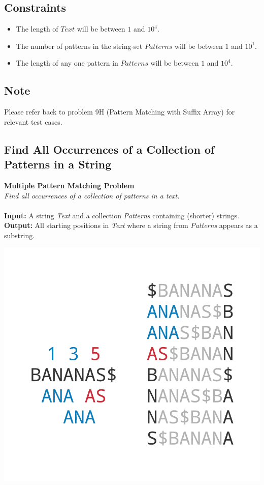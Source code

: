 \documentclass{article}
\begin{document}
\subsection*{Constraints}
\begin{itemize}
    \item The length of $Text$ will be between $1$ and $10^4$.
    \item The number of patterns in the string-set $Patterns$ will be between $1$ and $10^1$.
    \item The length of any one pattern in $Patterns$ will be between $1$ and $10^4$.
\end{itemize}

\subsection*{Note}
Please refer back to problem 9H (Pattern Matching with Suffix Array) for relevant test cases.
\pagebreak
\subsection{Find All Occurrences of a Collection of Patterns in a String}
\hline\vspace{5}
\noindent \textbf{Multiple Pattern Matching Problem} \\
\emph{Find all occurrences of a collection of patterns in a text.}\\ \\
\textbf{Input:} A string \emph{Text} and a collection \emph{Patterns} containing (shorter) strings. \\
\textbf{Output:} All starting positions in \emph{Text} where a string from \emph{Patterns} appears as a substring.
\begin{center}
    \includegraphics[scale=0.2]{c9/logos/9LMN.png} 
\end{center}
\hline\vspace{5}
\end{document}
